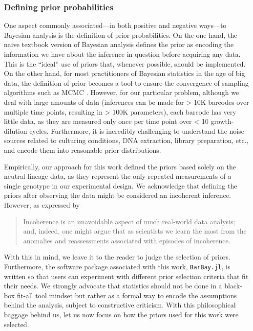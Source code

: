 \documentclass[
]{scrartcl}
\begin{document}
\begin{refsegment}
\hypertarget{defining-prior-probabilities}{%
\subsubsection{Defining prior
probabilities}\label{defining-prior-probabilities}}

One aspect commonly associated---in both positive and negative ways---to
Bayesian analysis is the definition of prior probabilities. On the one
hand, the naive textbook version of Bayesian analysis defines the prior
as encoding the information we have about the inference in question
before acquiring any data. This is the ``ideal'' use of priors that,
whenever possible, should be implemented. On the other hand, for most
practitioners of Bayesian statistics in the age of big data, the
definition of prior becomes a tool to ensure the convergence of sampling
algorithms such as MCMC \autocite{gelman2017}. However, for our
particular problem, although we deal with large amounts of data
(inferences can be made for \textgreater{} 10K barcodes over multiple
time points, resulting in \textgreater{} 100K parameters), each barcode
has very little data, as they are measured only once per time point over
\textless{} 10 growth-dilution cycles. Furthermore, it is incredibly
challenging to understand the noise sources related to culturing
conditions, DNA extraction, library preparation, etc., and encode them
into reasonable prior distributions.

Empirically, our approach for this work defined the priors based solely
on the neutral lineage data, as they represent the only repeated
measurements of a single genotype in our experimental design. We
acknowledge that defining the priors after observing the data might be
considered an incoherent inference. However, as expressed by
\textcite{gelman2017}

\begin{quote}
Incoherence is an unavoidable aspect of much real-world data analysis;
and, indeed, one might argue that as scientists we learn the most from
the anomalies and reassessments associated with episodes of incoherence.
\end{quote}

With this in mind, we leave it to the reader to judge the selection of
priors. Furthermore, the software package associated with this work,
\texttt{BarBay.jl}, is written so that users can experiment with
different prior selection criteria that fit their needs. We strongly
advocate that statistics should not be done in a black-box fit-all tool
mindset but rather as a formal way to encode the assumptions behind the
analysis, subject to constructive criticism. With this philosophical
baggage behind us, let us now focus on how the priors used for this work
were selected.


\end{refsegment}
\end{document}
